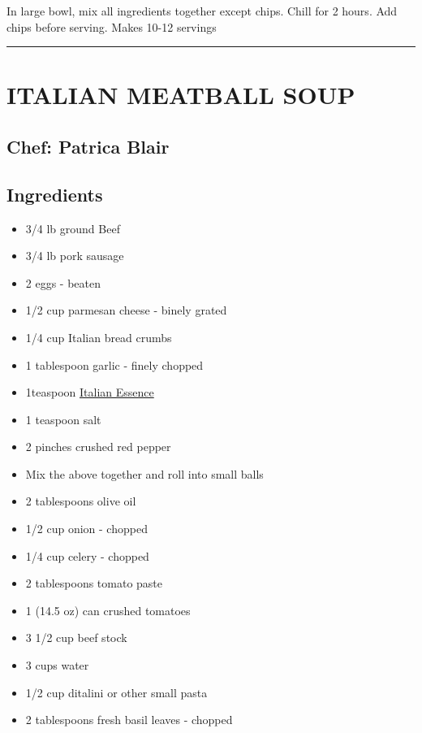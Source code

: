 \documentclass[
]{book}
\providecommand{\tightlist}{%
  \setlength{\itemsep}{0pt}\setlength{\parskip}{0pt}}
\begin{document}
In large bowl, mix all ingredients together except chips.
Chill for 2 hours. Add chips before serving. Makes 10-12 servings

\begin{center}\rule{0.5\linewidth}{0.5pt}\end{center}

\hypertarget{italian-meatball-soup}{%
\section*{ITALIAN MEATBALL SOUP}\label{italian-meatball-soup}}


\hypertarget{chef-patrica-blair}{%
\subsection*{Chef: Patrica Blair}\label{chef-patrica-blair}}


\hypertarget{ingredients-19}{%
\subsection*{Ingredients}\label{ingredients-19}}


\begin{itemize}
\tightlist
\item
  3/4 lb ground Beef
\item
  3/4 lb pork sausage
\item
  2 eggs - beaten
\item
  1/2 cup parmesan cheese - binely grated
\item
  1/4 cup Italian bread crumbs
\item
  1 tablespoon garlic - finely chopped
\item
  1teaspoon \href{https://www.emerils.com/121962/italian-essence}{Italian Essence}
\item
  1 teaspoon salt
\item
  2 pinches crushed red pepper
\item
  Mix the above together and roll into small balls
\item
  2 tablespoons olive oil
\item
  1/2 cup onion - chopped
\item
  1/4 cup celery - chopped
\item
  2 tablespoons tomato paste
\item
  1 (14.5 oz) can crushed tomatoes
\item
  3 1/2 cup beef stock
\item
  3 cups water
\item
  1/2 cup ditalini or other small pasta
\item
  2 tablespoons fresh basil leaves - chopped
\end{itemize}
\end{document}

